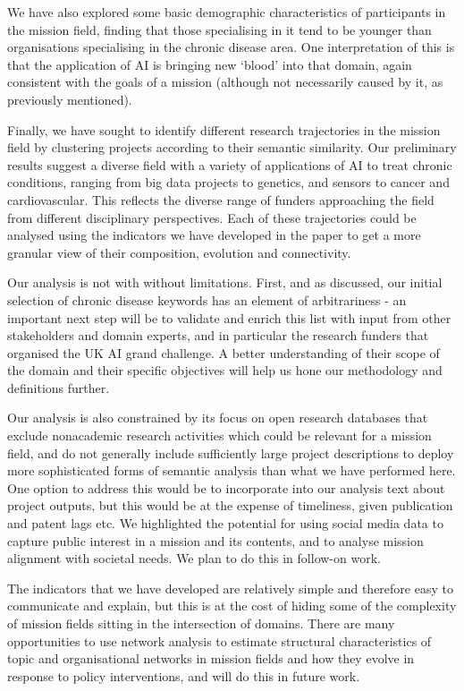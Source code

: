 \documentclass[11pt]{article}
\begin{document}
We have also explored some basic demographic characteristics of participants in the mission field, finding that those specialising in it tend to be younger than organisations specialising in the chronic disease area. One interpretation of this is that the application of AI is bringing new ‘blood’ into that domain, again consistent with the goals of a mission (although not
necessarily caused by it, as previously mentioned).

Finally, we have sought to identify different research trajectories in the mission field by clustering projects according to their semantic similarity. Our preliminary results suggest a diverse field with a variety of applications of AI to treat chronic conditions, ranging from big data projects to genetics, and sensors to cancer and cardiovascular. This reflects the diverse range of funders approaching the field from different disciplinary perspectives. Each of these trajectories could be analysed using the indicators we have developed in the paper to get a more granular view of their composition, evolution and connectivity. 

Our analysis is not with without limitations. First, and as discussed, our initial selection of chronic disease keywords has an element of arbitrariness - an important next step will be to validate and enrich this list with input from other stakeholders and domain experts, and in particular the research funders that organised the UK AI grand challenge. A better understanding of their scope of the domain and their specific objectives will help us hone our
methodology and definitions further.

Our analysis is also constrained by its focus on open research databases that exclude nonacademic research activities which could be relevant for a mission field, and do not generally include sufficiently large project descriptions to deploy more sophisticated forms of semantic analysis than what we have performed here. One option to address this would be to incorporate
into our analysis text about project outputs, but this would be at the expense of timeliness, given publication and patent lags etc. We highlighted the potential for using social media data to capture public interest in a mission and its contents, and to analyse mission alignment with societal needs. We plan to do this in follow-on work.

The indicators that we have developed are relatively simple and therefore easy to communicate and explain, but this is at the cost of hiding some of the complexity of mission fields sitting in the intersection of domains. There are many opportunities to use network analysis to estimate structural characteristics of topic and organisational networks in mission fields and how they evolve in response to policy interventions, and will do this in future
work. 
\end{document}
